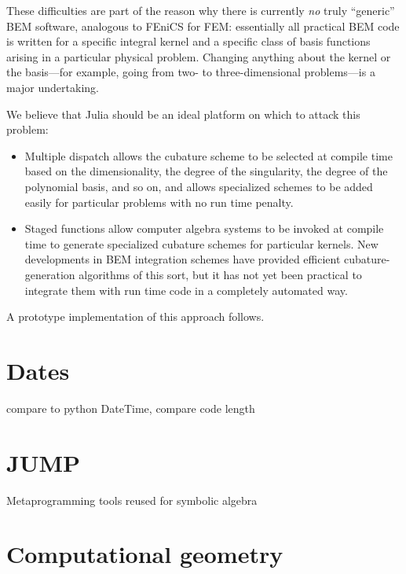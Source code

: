 These difficulties are part of the reason why there is currently \emph{no}
truly ``generic'' BEM software, analogous to FEniCS for FEM: essentially
all practical BEM code is written for a specific integral kernel and
a specific class of basis functions arising in a particular physical problem.
Changing anything about the kernel or the basis---for example, going
from two- to three-dimensional problems---is a major undertaking.

We believe that Julia should be an ideal platform on which to attack this
problem:

\begin{itemize}

\item Multiple dispatch allows the cubature scheme to be selected at compile time based on the dimensionality, the degree of the singularity, the degree of the polynomial basis, and so on, and allows specialized schemes to be added easily for particular problems with no run time penalty.

\item Staged functions allow computer algebra systems to be invoked at
  compile time to generate specialized cubature schemes for particular
  kernels.  New developments in BEM integration schemes \cite{ReidWhJo14} have
  provided efficient cubature-generation algorithms of this sort, but it
  has not yet been practical to integrate them with run time code in
  a completely automated way.

\end{itemize}

A prototype implementation of this approach follows.



\section{Dates}
\label{sec:dates}

compare to python DateTime, compare code length


\section{JUMP}

Metaprogramming tools reused for symbolic algebra


\section{Computational geometry}

